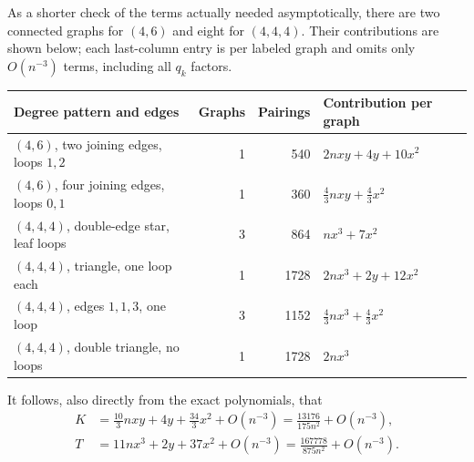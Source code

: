 \documentclass[11pt]{article}
\theoremstyle{definition}\newtheorem{definition}[theorem]{Definition}
\theoremstyle{remark}\newtheorem{remark}[theorem]{Remark}
\begin{document}
As a shorter check of the terms actually needed asymptotically, there are two
connected graphs for $(4,6)$ and eight for $(4,4,4)$. Their contributions are
shown below; each last-column entry is per labeled graph and omits only
$O(n^{-3})$ terms, including all $q_k$ factors.
\begin{center}
\small
\begin{tabular}{p{2.35in}rrl}
\toprule
Degree pattern and edges&Graphs&Pairings&Contribution per graph\\
\midrule
$(4,6)$, two joining edges, loops $1,2$&1&540&$2nxy+4y+10x^2$\\
$(4,6)$, four joining edges, loops $0,1$&1&360&$\frac43nxy+\frac43x^2$\\
$(4,4,4)$, double-edge star, leaf loops&3&864&$nx^3+7x^2$\\
$(4,4,4)$, triangle, one loop each&1&1728&$2nx^3+2y+12x^2$\\
$(4,4,4)$, edges $1,1,3$, one loop&3&1152&$\frac43nx^3+\frac43x^2$\\
$(4,4,4)$, double triangle, no loops&1&1728&$2nx^3$\\
\bottomrule
\end{tabular}
\end{center}
It follows, also directly from the exact polynomials, that
\begin{align}
 K&=\frac{10}3nxy+4y+\frac{34}3x^2+O(n^{-3})
    =\frac{13176}{175n^2}+O(n^{-3}),\label{zsm:eq:Klead}\\
 T&=11nx^3+2y+37x^2+O(n^{-3})
    =\frac{167778}{875n^2}+O(n^{-3}).\label{zsm:eq:Tlead}
\end{align}
\end{document}
